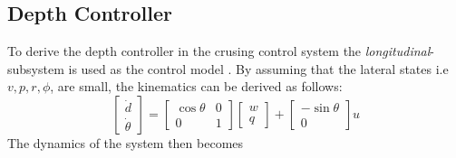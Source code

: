 	\subsection{Depth Controller}
		To derive the depth controller in the crusing control system the
		\textit{longitudinal}-subsystem is used as the control model \cite{fossen}. By assuming that the lateral
		states i.e $v, p, r, \phi$, are small, the kinematics can be derived as follows:
		\begin{equation}
			\left [ \begin{matrix}
					\dot{d} \\
					\dot{\theta}
				\end{matrix} \right] = \left [ \begin{matrix}
								\cos{\theta} & 0 \\
								0 & 1
								\end{matrix} \right] 
						\left[ \begin{matrix}
								w \\
								q
							\end{matrix} \right]
						+ \left [ \begin{matrix}
								-\sin{\theta}\\
								0
							\end{matrix} \right] u
		\end{equation}
		The dynamics of the system then becomes
